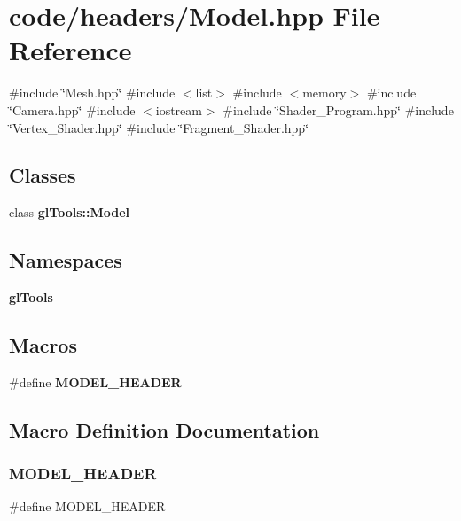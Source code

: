 \section{code/headers/\+Model.hpp File Reference}
\label{_model_8hpp}
{\ttfamily \#include \char`\"{}Mesh.\+hpp\char`\"{}}\newline
{\ttfamily \#include $<$list$>$}\newline
{\ttfamily \#include $<$memory$>$}\newline
{\ttfamily \#include \char`\"{}Camera.\+hpp\char`\"{}}\newline
{\ttfamily \#include $<$iostream$>$}\newline
{\ttfamily \#include \char`\"{}Shader\+\_\+\+Program.\+hpp\char`\"{}}\newline
{\ttfamily \#include \char`\"{}Vertex\+\_\+\+Shader.\+hpp\char`\"{}}\newline
{\ttfamily \#include \char`\"{}Fragment\+\_\+\+Shader.\+hpp\char`\"{}}\newline
\subsection*{Classes}
\begin{DoxyCompactItemize}
\item 
class \textbf{ gl\+Tools\+::\+Model}
\end{DoxyCompactItemize}
\subsection*{Namespaces}
\begin{DoxyCompactItemize}
\item 
 \textbf{ gl\+Tools}
\end{DoxyCompactItemize}
\subsection*{Macros}
\begin{DoxyCompactItemize}
\item 
\#define \textbf{ M\+O\+D\+E\+L\+\_\+\+H\+E\+A\+D\+ER}
\end{DoxyCompactItemize}


\subsection{Macro Definition Documentation}
\mbox{\label{_model_8hpp_a2a6d99850e9308b0980b4708468fbe3b}} 
\subsubsection{MODEL\_HEADER}
{\footnotesize\ttfamily \#define M\+O\+D\+E\+L\+\_\+\+H\+E\+A\+D\+ER}


